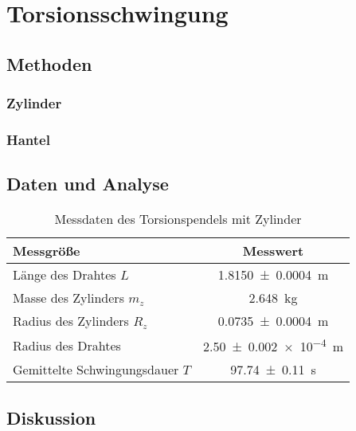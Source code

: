 \section{Torsionsschwingung}


\subsection{Methoden}

\subsubsection*{Zylinder}




\subsubsection*{Hantel}





\subsection{Daten und Analyse}
 
 
 
 
 
\begin{table}[h]
\centering	
\caption{Messdaten des Torsionspendels mit Zylinder}
 \begin{tabular}{|l|c|}
 
 	\hline 
 Messgröße	& Messwert  \\ 
 	\hline 
 	Länge des Drahtes $L$& \SI{1.8150\pm 0.0004 } {m} \\ 
 	\hline 
 	Masse des Zylinders $m_z$& \SI{2.648}{kg} \\ 
 	\hline 
 	Radius des Zylinders $R_z$ & \SI{0.0735 \pm 0.0004}{m}  \\ 
 	\hline 
 	Radius des Drahtes & \SI{2.50+-0.002 e-4} {m} \\ 
 	\hline 
 	Gemittelte Schwingungsdauer $T$&\SI{97.74+-0.11}{s}  \\ 
 	\hline 
 \end{tabular} 

\end{table} 













\subsection{Diskussion}


